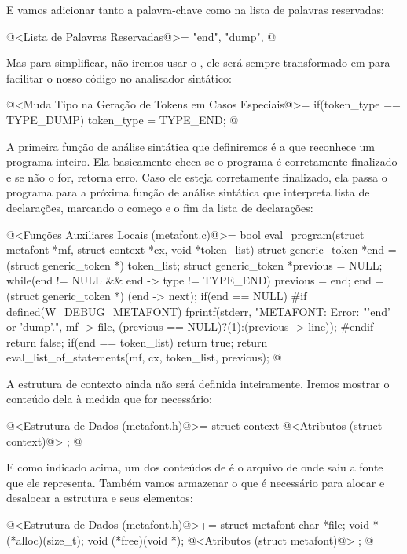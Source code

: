 E vamos adicionar tanto a palavra-chave 
como  na lista de palavras reservadas:

\iniciocodigo
@<Lista de Palavras Reservadas@>=
"end", "dump",
@
\fimcodigo

Mas para simplificar, não iremos usar o , ele
será sempre transformado em  para facilitar o
nosso código no analisador sintático:

\iniciocodigo
@<Muda Tipo na Geração de Tokens em Casos Especiais@>=
if(token_type == TYPE_DUMP)
  token_type = TYPE_END;
@
\fimcodigo

A primeira função de análise sintática que definiremos é a que
reconhece um programa inteiro. Ela basicamente checa se o programa é
corretamente finalizado e se não o for, retorna erro. Caso ele esteja
corretamente finalizado, ela passa o programa para a próxima função de
análise sintática que interpreta lista de declarações, marcando o
começo e o fim da lista de declarações:

\iniciocodigo
@<Funções Auxiliares Locais (metafont.c)@>=
bool eval_program(struct metafont *mf, struct context *cx,
                  void *token_list){
  struct generic_token *end = (struct generic_token *) token_list;
  struct generic_token *previous = NULL;
  while(end != NULL && end -> type != TYPE_END){
    previous = end;
    end = (struct generic_token *) (end -> next);
  }
  if(end == NULL){
#if defined(W_DEBUG_METAFONT)
    fprintf(stderr, "METAFONT: Error: %
                    "'end' or 'dump'.\n", mf -> file,
                    (previous == NULL)?(1):(previous -> line));
#endif
    return false;
  }
  if(end == token_list)
    return true;
  return eval_list_of_statements(mf, cx, token_list, previous);
}
@
\fimcodigo

A estrutura de contexto ainda não será definida inteiramente. Iremos
mostrar o conteúdo dela à medida que for necessário:

\iniciocodigo
@<Estrutura de Dados (metafont.h)@>=
struct context{
  @<Atributos (struct context)@>
};
@
\fimcodigo

E como indicado acima, um dos conteúdos de  é o arquivo de onde saiu a fonte que ele representa. Também
vamos armazenar o que é necessário para alocar e desalocar a estrutura
e seus elementos:

\iniciocodigo
@<Estrutura de Dados (metafont.h)@>+=
struct metafont{
  char *file;
  void *(*alloc)(size_t);
  void (*free)(void *);
  @<Atributos (struct metafont)@>
};
@
\fimcodigo

